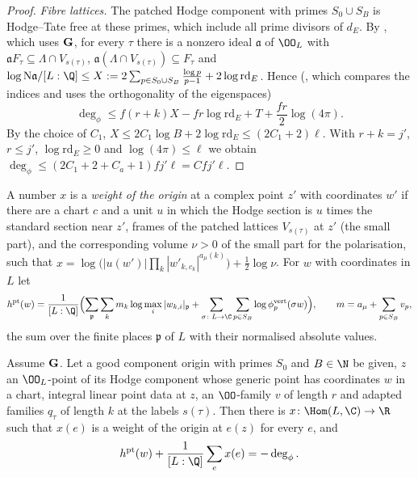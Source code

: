 \begin{proof}
\emph{Fibre lattices.} The patched Hodge component with primes $S_0\cup S_B$ is Hodge--Tate free at these primes,
which include all prime divisors of $d_E$. By , which uses
$\mathbf G$, for every $\tau$ there is a nonzero ideal $\mathfrak a$ of $\OO_L$ with
$\mathfrak aF_\tau\subseteq\Lambda\cap V_{s(\tau)}$, $\mathfrak a(\Lambda\cap V_{s(\tau)})\subseteq F_\tau$ and
$\log\mathrm N\mathfrak a/[L:\Q]\le X:=2\sum_{p\in S_0\cup S_B}\frac{\log p}{p-1}+2\log\mathrm{rd}_E$. Hence
(, which compares the indices and uses the orthogonality of the eigenspaces)
\[
\deg_\phi\le f(r+k)X-fr\log\mathrm{rd}_E+T+\frac{fr}2\log(4\pi).
\]
By the choice of $C_1$, $X\le2C_1\log B+2\log\mathrm{rd}_E\le(2C_1+2)\ell$. With $r+k=j'$, $r\le j'$,
$\log\mathrm{rd}_E\ge0$ and $\log(4\pi)\le\ell$ we obtain $\deg_\phi\le(2C_1+2+C_a+1)fj'\ell=Cfj'\ell$.
\end{proof}

A number $x$ is a \emph{weight of the origin} at a complex point $z'$ with coordinates $w'$ if there are a chart $c$
and a unit $u$ in which the Hodge section is $u$ times the standard section near $z'$, frames of the patched lattices
$V_{s(\tau)}$ at $z'$ (the small part), and the corresponding volume $\nu>0$ of the small part for the polarisation,
such that $x=\log\bigl(|u(w')|\prod_k|w'_{k,c_k}|^{a_\mu(k)}\bigr)+\frac12\log\nu$. For $w$ with coordinates in $L$
let
\[
h^{\mathrm{pt}}(w)=\frac1{[L:\Q]}\Bigl(\sum_{\mathfrak p}\sum_km_k\log\max_i|w_{k,i}|_{\mathfrak p}
+\sum_{\sigma\colon L\to\C}\sum_{p\in S_B}\log\phi^{\mathrm{vert}}_p(\sigma w)\Bigr),\qquad m=a_\mu+\sum_{p\in S_B}v_p,
\]
the sum over the finite places $\mathfrak p$ of $L$ with their normalised absolute values.

\begin{proposition}\label{pf:towergeo:cih}
Assume $\mathbf G$. Let a good component origin with primes $S_0$ and $B\in\N$ be given, $z$ an $\OO_L$-point of its
Hodge component whose generic point has coordinates $w$ in a chart, integral linear point data at $z$, an
$\OO$-family $v$ of length $r$ and adapted families $q_\tau$ of length $k$ at the labels $s(\tau)$. Then there is
$x\colon\Hom(L,\C)\to\R$ such that $x(e)$ is a weight of the origin at $e(z)$ for every $e$, and
\[
h^{\mathrm{pt}}(w)+\frac1{[L:\Q]}\sum_ex(e)=-\deg_\phi .
\]
\end{proposition}

